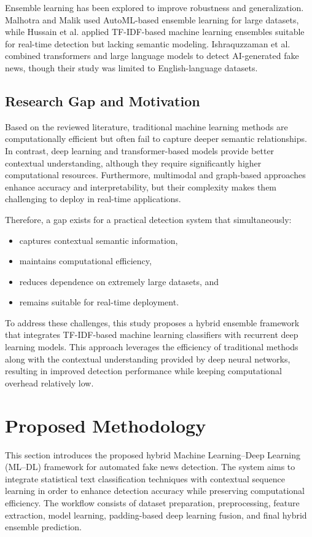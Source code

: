 \documentclass[conference]{IEEEtran}
\begin{document}
Ensemble learning has been explored to improve robustness and generalization. Malhotra and Malik \cite{malhotra2024} used AutoML-based ensemble learning for large datasets, while Hussain et al. \cite{hussain2025} applied TF-IDF-based machine learning ensembles suitable for real-time detection but lacking semantic modeling. Ishraquzzaman et al. \cite{ishraquzzaman2025} combined transformers and large language models to detect AI-generated fake news, though their study was limited to English-language datasets.

\subsection{Research Gap and Motivation}
Based on the reviewed literature, traditional machine learning methods are computationally efficient but often fail to capture deeper semantic relationships. In contrast, deep learning and transformer-based models provide better contextual understanding, although they require significantly higher computational resources. Furthermore, multimodal and graph-based approaches enhance accuracy and interpretability, but their complexity makes them challenging to deploy in real-time applications.

Therefore, a gap exists for a practical detection system that simultaneously:
\begin{itemize}
    \item captures contextual semantic information,
    \item maintains computational efficiency,
    \item reduces dependence on extremely large datasets, and
    \item remains suitable for real-time deployment.
\end{itemize}

To address these challenges, this study proposes a hybrid ensemble framework that integrates TF-IDF-based machine learning classifiers with recurrent deep learning models. This approach leverages the efficiency of traditional methods along with the contextual understanding provided by deep neural networks, resulting in improved detection performance while keeping computational overhead relatively low.

\section{Proposed Methodology}
\label{sec:method}

This section introduces the proposed hybrid Machine Learning–Deep Learning (ML–DL) framework for automated fake news detection. The system aims to integrate statistical text classification techniques with contextual sequence learning in order to enhance detection accuracy while preserving computational efficiency. The workflow consists of dataset preparation, preprocessing, feature extraction, model learning, padding-based deep learning fusion, and final hybrid ensemble prediction.
\end{document}
